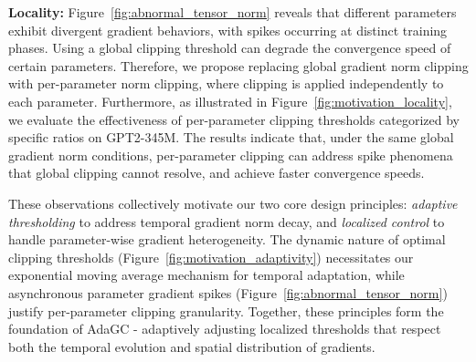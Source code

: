 {\bf Locality:} Figure~\ref{fig:abnormal_tensor_norm} reveals that different parameters exhibit divergent gradient behaviors, with spikes occurring at distinct training phases. Using a global clipping threshold can degrade the convergence speed of certain parameters. Therefore, we propose replacing global gradient norm clipping with per-parameter norm clipping, where clipping is applied independently to each parameter. Furthermore, as illustrated in Figure~\ref{fig:motivation_locality}, we evaluate the effectiveness of per-parameter clipping thresholds categorized by specific ratios on GPT2-345M. The results indicate that, under the same global gradient norm conditions, per-parameter clipping can address spike phenomena that global clipping cannot resolve, and achieve faster convergence speeds.

These observations collectively motivate our two core design principles: \textit{adaptive thresholding} to address temporal gradient norm decay, and \textit{localized control} to handle parameter-wise gradient heterogeneity. The dynamic nature of optimal clipping thresholds (Figure~\ref{fig:motivation_adaptivity}) necessitates our exponential moving average mechanism for temporal adaptation, while asynchronous parameter gradient spikes (Figure~\ref{fig:abnormal_tensor_norm}) justify per-parameter clipping granularity. Together, these principles form the foundation of AdaGC - adaptively adjusting localized thresholds that respect both the temporal evolution and spatial distribution of gradients.






